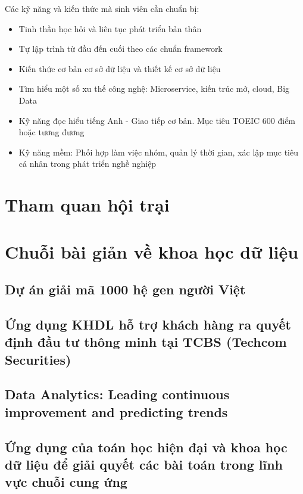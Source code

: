 \documentclass[14pt, a4paper]{article}
\numberwithin{equation}{section}
\numberwithin{figure}{section}
\numberwithin{dl}{section}
\numberwithin{md}{section}
\numberwithin{bd}{section}
\numberwithin{dn}{section}
\numberwithin{hq}{section}
\begin{document}
    Các kỹ năng và kiến thức mà sinh viên cần chuẩn bị:

    \begin{itemize}
        \item Tinh thần học hỏi và liên tục phát triển bản thân
        \item Tự lập trình từ đầu đến cuối theo các chuẩn framework
        \item Kiến thức cơ bản cơ sở dữ liệu và thiết kế cơ sở dữ liệu
        \item Tìm hiểu một số xu thế công nghệ: Microservice, kiến trúc mở, cloud, Big Data
        \item Kỹ năng đọc hiểu tiếng Anh - Giao tiếp cơ bản. Mục tiêu TOEIC 600 điểm hoặc tương đương
        \item Kỹ năng mềm: Phối hợp làm việc nhóm, quản lý thời gian, xác lập mục tiêu cá nhân trong phát triển nghề nghiệp
    \end{itemize}
    \section{Tham quan hội trại}

    \section{Chuỗi bài giản về khoa học dữ liệu}

    \subsection{Dự án giải mã 1000 hệ gen người Việt}

    \subsection{Ứng dụng KHDL hỗ trợ khách hàng ra quyết định đầu tư thông minh tại TCBS (Techcom Securities)}

    \subsection{Data Analytics: Leading continuous improvement and predicting trends}

    \subsection{Ứng dụng của toán học hiện đại và khoa học dữ liệu để giải quyết các bài toán trong lĩnh vực chuỗi cung ứng}
\end{document}
